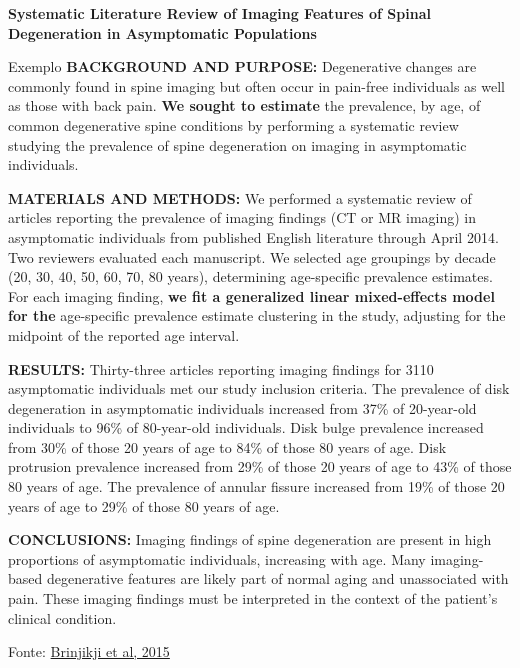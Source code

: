 \documentclass{beamer}
\begin{document}
\begin{frame}{\tiny \bf Systematic Literature Review of Imaging Features of Spinal Degeneration in Asymptomatic Populations}
  \begin{exampleblock}{Exemplo}
    \tiny
    {\bf BACKGROUND AND PURPOSE:} Degenerative changes are commonly found in spine imaging but often occur in pain-free individuals as well as those with back pain.
    \alert{\bf \scriptsize We sought to estimate} the prevalence, by age, of common degenerative spine conditions by performing a systematic review studying the prevalence of spine degeneration on imaging in asymptomatic individuals.

    {\bf MATERIALS AND METHODS:} We performed a systematic review of articles reporting the prevalence of imaging findings (CT or MR imaging) in asymptomatic individuals from published English literature through April 2014.
    Two reviewers evaluated each manuscript.
    We selected age groupings by decade (20, 30, 40, 50, 60, 70, 80 years), determining age-specific prevalence estimates.
    For each imaging finding, \alert{\bf \scriptsize we fit a generalized linear mixed-effects model for the} age-specific prevalence estimate clustering in the study, adjusting for the midpoint of the reported age interval.

    {\bf RESULTS:} Thirty-three articles reporting imaging findings for 3110 asymptomatic individuals met our study inclusion criteria.
    The prevalence of disk degeneration in asymptomatic individuals increased from 37\% of 20-year-old individuals to 96\% of 80-year-old individuals.
    Disk bulge prevalence increased from 30\% of those 20 years of age to 84\% of those 80 years of age. Disk protrusion prevalence increased from 29\% of those 20 years of age to 43\% of those 80 years of age.
    The prevalence of annular fissure increased from 19\% of those 20 years of age to 29\% of those 80 years of age.

{\bf CONCLUSIONS:} Imaging findings of spine degeneration are present in high proportions of asymptomatic individuals, increasing with age.
Many imaging-based degenerative features are likely part of normal aging and unassociated with pain.
These imaging findings must be interpreted in the context of the patient’s clinical condition.
  \end{exampleblock}
  \vfill
  \scriptsize
  \hfill Fonte: \href{http://dx.doi.org/10.3174/ajnr.A4173}
  {\tiny Brinjikji et al, 2015}
\end{frame}
\end{document}
